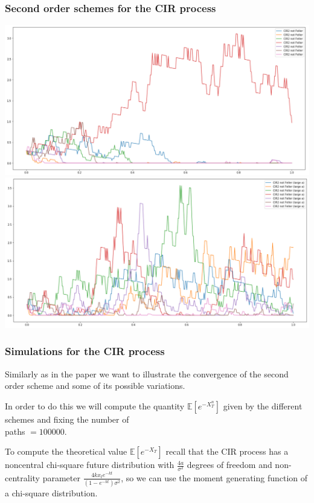 \documentclass[12pt]{beamer}
\begin{document}
\begin{frame}
	\frametitle{Second order schemes for the CIR process}
	\centering
	\includegraphics[height=0.4\textheight, width=\textwidth]{paths_cir2_not_feller.png}\\
	\includegraphics[height=0.4\textheight, width=\textwidth]{paths_cir2_not_feller_large_a.png}
\end{frame}

\begin{frame}
\frametitle{Simulations for the CIR process}
Similarly as in the paper we want to illustrate the convergence of the second order scheme and some of its possible variations. 
\vspace{0.1cm}

In order to do this we will compute the quantity $\mathbb{E}[e^{-X_T^n}]$ given by the different schemes and fixing the number of \\paths $= 100000$.
\vspace{0.3cm}

To compute the theoretical value $\mathbb{E}[e^{-X_T}]$ recall that the CIR process has a noncentral chi-square future distribution with $\frac{4a}{\sigma^2}$ degrees of freedom and non-centrality parameter $\frac{4kx_te^{-kt}}{(1 - e^{-kt})\sigma^2}$, so we can use the moment generating function of a chi-square distribution.

\end{frame}
\end{document}
